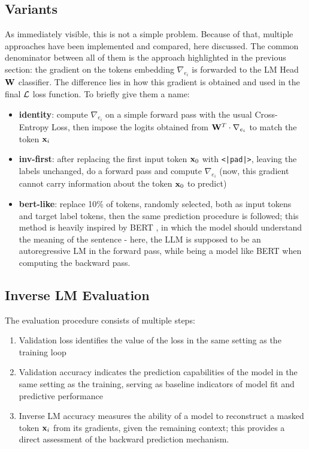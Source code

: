 \documentclass[../thesis.tex]{subfiles}
\begin{document}
\subsection{Variants}
As immediately visible, this is not a simple problem. Because of that, multiple approaches have been implemented and compared, here discussed.
The common denominator between all of them is the approach highlighted in the previous section: the gradient on the tokens embedding $\nabla_{e_i}$ is forwarded to the LM Head $\mathbf{W}$ classifier. The difference lies in how this gradient is obtained and used in the final $\mathcal{L}$ loss function.
To briefly give them a name:
\begin{itemize}
    \item \textbf{identity}: compute $\nabla_{e_i}$ on a simple forward pass with the usual Cross-Entropy Loss, then impose the logits obtained from $\mathbf{W}^T \cdot \nabla_{e_i}$ to match the token $\mathbf{x}_i$
    \item \textbf{inv-first}: after replacing the first input token $\mathbf{x}_0$ with \texttt{<|pad|>}, leaving the labels unchanged, do a forward pass and compute $\nabla_{e_i}$ (now, this gradient cannot carry information about the token $\mathbf{x}_0$ to predict)
    \item \textbf{bert-like}: replace 10\% of tokens, randomly selected, both as input tokens and target label tokens, then the same prediction procedure is followed; this method is heavily inspired by BERT \citep{devlin2019bert}, in which the model should understand the meaning of the sentence - here, the LLM is supposed to be an autoregressive LM in the forward pass, while being a model like BERT when computing the backward pass.
\end{itemize}


\subsection{Inverse LM Evaluation}
\label{sec:ilm_first_evaluation}
The evaluation procedure consists of multiple steps:
\begin{enumerate}
    \item Validation loss identifies the value of the loss in the same setting as the training loop
    \item Validation accuracy indicates the prediction capabilities of the model in the same setting as the training, serving as baseline indicators of model fit and predictive performance
    \item Inverse LM accuracy measures the ability of a model to reconstruct a masked token $\mathbf{x}_i$ from its gradients, given the remaining context; this provides a direct assessment of the backward prediction mechanism.
\end{enumerate}
\end{document}
